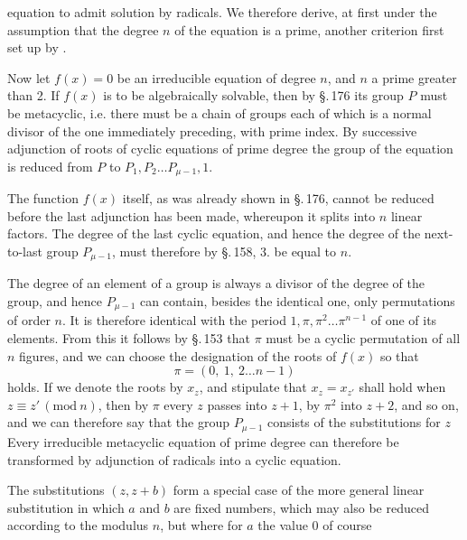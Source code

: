 equation to admit solution by radicals. We therefore derive, at first under the
assumption that the degree $n$ of the equation is a prime, another criterion first set
up by .

Now let $f(x) = 0$ be an irreducible equation of degree $n$, and $n$ a prime greater
than 2. If $f(x)$ is to be algebraically solvable, then by \S.\,176 its group $P$ must
be metacyclic, i.e. there must be a chain of groups
each of which is a normal divisor of the one immediately preceding, with prime index.
By successive adjunction of roots of cyclic equations of prime degree the group of the
equation is reduced from $P$ to $P_1, P_2 \ldots P_{\mu-1}, 1$.

The function $f(x)$ itself, as was already shown in \S.\,176, cannot be reduced before
the last adjunction has been made, whereupon it splits into $n$ linear factors. The
degree of the last cyclic equation, and hence the degree of the next-to-last group
$P_{\mu-1}$, must therefore by \S.\,158, 3. be equal to $n$.

The degree of an element of a group is always a divisor of the degree of the group, and
hence $P_{\mu-1}$ can contain, besides the identical one, only permutations of order
$n$. It is therefore identical with the period $1, \pi, \pi^2 \ldots \pi^{n-1}$ of one
of its elements. From this it follows by \S.\,153 that $\pi$ must be a cyclic
permutation of all $n$ figures, and we can choose the designation of the roots of
$f(x)$ so that
\[ \pi = (0,\ 1,\ 2 \ldots n-1) \]
holds. If we denote the roots by $x_z$, and stipulate that $x_z = x_{z'}$ shall hold
when $z \equiv z' \, (\mathrm{mod}\ n)$, then by $\pi$ every $z$ passes into $z+1$, by
$\pi^2$ into $z+2$, and so on, and we can therefore say that the group $P_{\mu-1}$
consists of the substitutions for $z$
Every irreducible metacyclic equation of prime degree can therefore be transformed by
adjunction of radicals into a cyclic equation.

The substitutions $(z, z+b)$ form a special case of the more general linear
substitution
in which $a$ and $b$ are fixed numbers, which may also be reduced according to the
modulus $n$, but where for $a$ the value 0 of course
